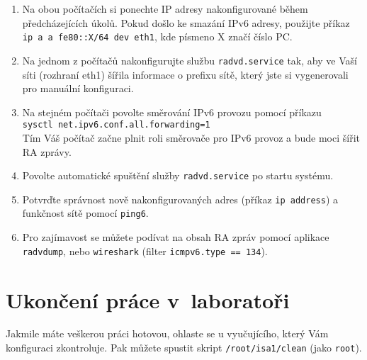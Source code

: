 \begin{enumerate}
    \item Na obou počítačích si ponechte IP adresy nakonfigurované během
        předcházejících úkolů. Pokud došlo ke smazání IPv6 adresy, použijte příkaz \texttt{ip a a fe80::X/64 dev eth1}, kde písmeno X značí číslo PC.
    \item Na jednom z počítačů nakonfigurujte službu \texttt{radvd.service} tak,
        aby ve Vaší síti (rozhraní eth1) šířila informace o prefixu sítě, který
        jste si vygenerovali pro manuální konfiguraci.
    \item Na stejném počítači povolte směrování IPv6 provozu pomocí příkazu\\
        \texttt{sysctl net.ipv6.conf.all.forwarding=1}\\
        Tím Váš počítač začne plnit roli směrovače pro IPv6 provoz a bude moci
        šířit RA zprávy.
    \item Povolte automatické spuštění služby \texttt{radvd.service} po startu systému.
    \item Potvrďte správnost nově nakonfigurovaných adres (příkaz \texttt{ip
        address}) a funkčnost sítě pomocí \texttt{ping6}.
    \item Pro zajímavost se můžete podívat na obsah RA zpráv pomocí aplikace
        \texttt{radvdump}, nebo \texttt{wireshark} (filter \texttt{icmpv6.type
        == 134}).
\end{enumerate}

\section{Ukončení práce v~laboratoři}
Jakmile máte veškerou práci hotovou, ohlaste se u vyučujícího, který Vám
konfiguraci zkontroluje. Pak můžete spustit skript {\tt /root/isa1/clean} (jako
\texttt{root}).
